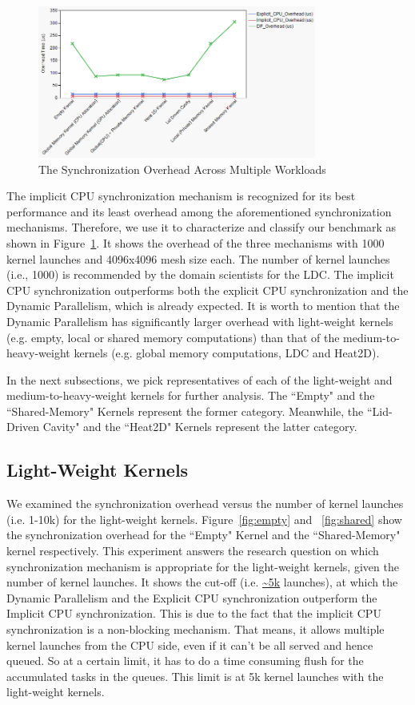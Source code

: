 \documentclass[conference]{IEEEtran}
\begin{document}
\begin{figure}
	\includegraphics[width=1.0\columnwidth, height=5cm]{charaterize_overhead_arcoss_apps.png}
	\caption{The Synchronization Overhead Across Multiple Workloads}
	\label{fig:cpu_dp}
\end{figure}

The implicit CPU synchronization mechanism is recognized for its best performance and its least overhead among the aforementioned synchronization mechanisms. Therefore, we use it to characterize and classify our benchmark as shown in Figure~\ref{fig:cpu_dp}. It shows the overhead of the three mechanisms with 1000 kernel launches and 4096x4096 mesh size each. The number of kernel launches (i.e., 1000) is recommended by the domain scientists for the LDC. The implicit CPU synchronization outperforms both the explicit CPU synchronization and the Dynamic Parallelism, which is already expected. It is worth to mention that the Dynamic Parallelism has significantly larger overhead with light-weight kernels (e.g. empty, local or shared memory computations) than that of the medium-to-heavy-weight kernels (e.g. global memory computations, LDC and Heat2D). 

In the next subsections, we pick representatives of each of the light-weight and medium-to-heavy-weight kernels for further analysis. The ``Empty" and the ``Shared-Memory" Kernels represent the former category. Meanwhile, the ``Lid-Driven Cavity" and the ``Heat2D" Kernels represent the latter category. 

\subsection{Light-Weight Kernels}
We examined the synchronization overhead versus the number of kernel launches (i.e. 1-10k) for the light-weight kernels. Figure~\ref{fig:empty} and ~\ref{fig:shared} show the synchronization overhead for the ``Empty" Kernel and the ``Shared-Memory" kernel respectively. This experiment answers the research question on which synchronization mechanism is appropriate for the light-weight kernels, given the number of kernel launches. It shows the cut-off (i.e. \url{~5k} launches), at which the Dynamic Parallelism and the Explicit CPU synchronization outperform the Implicit CPU synchronization. This is due to the fact that the implicit CPU synchronization is a non-blocking mechanism. That means, it allows multiple kernel launches from the CPU side, even if it can't be all served and hence queued. So at a certain limit, it has to do a time consuming flush for the accumulated tasks in the queues. This limit is at 5k kernel launches with the light-weight kernels. 
\end{document}
